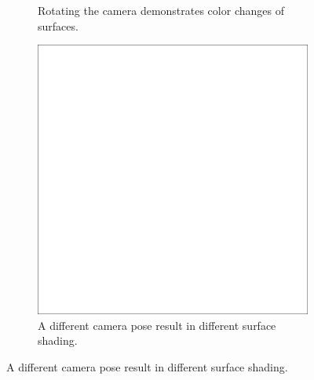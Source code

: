 \begin{figure}[H]
\begin{subfigure}[t]{0.32\textwidth}
        \caption{Rotating the camera demonstrates color changes of surfaces.}
    \end{subfigure}
    \begin{subfigure}[t]{0.32\textwidth}
        \includegraphics[width=\linewidth]{chapter04/img/max-0210.png}
        \caption{A different camera pose result in different surface shading.}
    \end{subfigure}
\end{figure}
